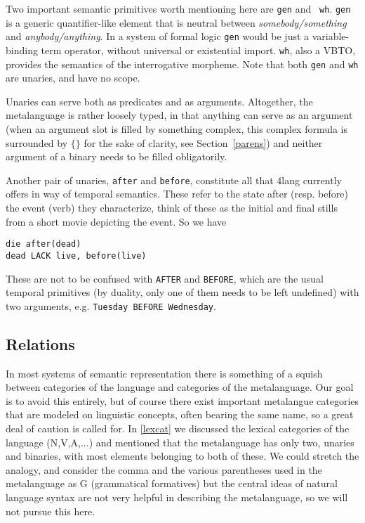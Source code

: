 \documentclass[11pt,bookmarks,bookmarksnumbered,naturalnames,plainpages=false,pdftex,colorlinks=true,urlcolor=blue,bookmarksdepth=subsection,plainpages=false]{paper}
\begin{document}
Two important semantic primitives worth mentioning here are {\tt gen} and {\tt
  wh}.  {\tt gen} is a generic quantifier-like element that is neutral between
{\it somebody/something} and {\it anybody/anything}. In a system of formal
logic {\tt gen} would be just a variable-binding term operator, without
universal or existential import.  {\tt wh}, also a VBTO, provides the
semantics of the interrogative morpheme. Note that both {\tt gen} and {\tt wh}
are unaries, and have no scope. 

Unaries can serve both as predicates and as arguments.  Altogether, the
metalanguage is rather loosely typed, in that anything can serve as an
argument (when an argument slot is filled by something complex, this complex
formula is surrounded by $\{ \}$ for the sake of clarity, see
Section~\ref{parens}) and neither argument of a binary needs to be filled
obligatorily. 

Another pair of unaries, {\tt after} and {\tt before}, constitute all that
4lang currently offers in way of temporal semantics. These refer to the state 
after (resp. before) the event (verb) they characterize, think of these as
the initial and final stills from a short movie depicting the event. So we have 

\begin{verbatim}
die after(dead)
dead LACK live, before(live)
\end{verbatim}

\noindent
These are not to be confused with {\tt AFTER} and {\tt BEFORE}, which are the
usual temporal primitives (by duality, only one of them needs to be left
undefined) with two arguments, e.g. {\tt Tuesday BEFORE Wednesday}.


\subsection{Relations}\label{rel}

In most systems of semantic representation there is something of a squish
between categories of the language and categories of the metalanguage. Our
goal is to avoid this entirely, but of course there exist important metalangue
categories that are modeled on linguistic concepts, often bearing the same
name, so a great deal of caution is called for. In \ref{lexcat} we discussed
the lexical categories of the language (N,V,A,...) and mentioned that the
metalanguage has only two, unaries and binaries, with most elements belonging
to both of these. We could stretch the analogy, and consider the comma and the
various parentheses used in the metalanguage as G (grammatical formatives) but
the central ideas of natural language syntax are not very helpful in
describing the metalanguage, so we will not pursue this here.
\end{document}
